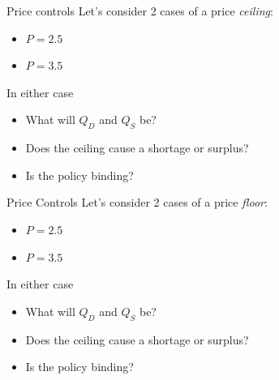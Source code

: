 \documentclass[compress]{beamer}
\begin{document}
\begin{frame}{Price controls}
Let's consider 2 cases of a price \textit{ceiling}:
\begin{itemize}
\item $P = 2.5$
\item $P = 3.5$
\end{itemize}

\begin{block}{In either case}
    \begin{itemize}
        \item What will $Q_D$ and $Q_S$ be?
        \item Does the ceiling cause a shortage or surplus?
        \item Is the policy binding?
    \end{itemize}
\end{block}
\end{frame}


\begin{frame}{Price Controls}
Let's consider 2 cases of a price \textit{floor}:
\begin{itemize}
\item $P = 2.5$
\item $P = 3.5$
\end{itemize}

\begin{block}{In either case}
    \begin{itemize}
        \item What will $Q_D$ and $Q_S$ be?
        \item Does the ceiling cause a shortage or surplus?
        \item Is the policy binding?
    \end{itemize}
\end{block}
\end{frame}
\end{document}
